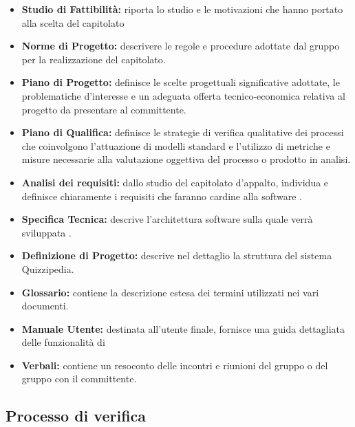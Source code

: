 \documentclass[a4paper,11pt]{article}
\begin{document}
			\begin{itemize}
			
				\item  \textbf{Studio di Fattibilità:} riporta lo studio e le motivazioni che hanno portato alla scelta del capitolato 
			 
				\item  \textbf{Norme di Progetto:}	descrivere le regole e procedure adottate dal gruppo per la realizzazione del capitolato. 	
			
				\item  \textbf{Piano di Progetto:}	definisce le scelte progettuali significative adottate, le problematiche d'interesse e un adeguata offerta tecnico-economica relativa al progetto da presentare al committente.
							
				\item  \textbf{Piano di Qualifica:}	definisce le strategie di verifica qualitative dei processi che coinvolgono l'attuazione di modelli standard e l'utilizzo di metriche  e misure necessarie alla valutazione oggettiva del processo o prodotto in analisi.
				
				\item  \textbf{Analisi dei requisiti:} dallo studio del capitolato d'appalto, individua e definisce chiaramente i requisiti che faranno cardine alla software .
				
				\item  \textbf{Specifica Tecnica:} descrive l'architettura software sulla quale verrà sviluppata .									
			
				\item  \textbf{Definizione di Progetto:} descrive nel dettaglio la struttura del sistema Quizzipedia.
			
				\item  \textbf{Glossario:} contiene la descrizione estesa dei termini utilizzati nei vari documenti.
			
				\item  \textbf{Manuale Utente:} destinata all'utente finale, fornisce una guida dettagliata delle funzionalità di 
			
				\item  \textbf{Verbali:} contiene un resoconto delle incontri e riunioni del gruppo o del gruppo con il committente. 
			
			\end{itemize}
			
						
			\subsection{Processo di verifica}
\end{document}
